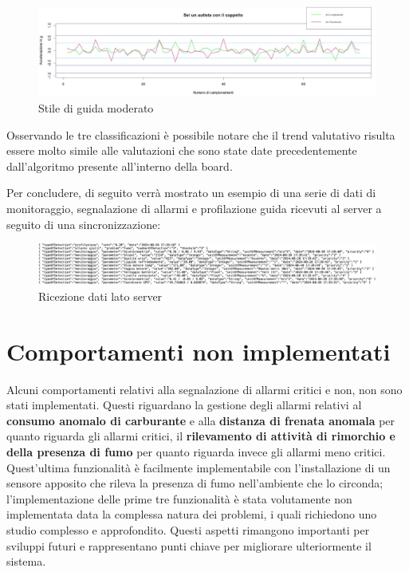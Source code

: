 \documentclass[12pt, a4paper, italian]{report}
\numberwithin{figure}{chapter}
\numberwithin{table}{chapter}
\begin{document}
\begin{figure}[h]
  \centering
  \includegraphics[width=14cm]{GuidaModerata.png}
  \caption{Stile di guida moderato}
  \label{Guida moderata}
\end{figure}

\newpage

Osservando le tre classificazioni è possibile notare che il trend valutativo risulta essere molto simile alle valutazioni che sono state date precedentemente dall'algoritmo presente all'interno della board. 

\vspace{1cm}

Per concludere, di seguito verrà mostrato un esempio di una serie di dati di monitoraggio, segnalazione di allarmi e profilazione guida ricevuti al server a seguito di una sincronizzazione:

\begin{figure}[h]
  \centering
  \includegraphics[width=16cm]{datiServer.png}
  \caption{Ricezione dati lato server}
  \label{fig:datiServer}
\end{figure}

\newpage

\section{Comportamenti non implementati}
Alcuni comportamenti relativi alla segnalazione di allarmi critici e non, non sono stati implementati. Questi riguardano la gestione degli allarmi relativi al \textbf{consumo anomalo di carburante} e alla \textbf{distanza di frenata anomala} per quanto riguarda gli allarmi critici, il \textbf{rilevamento di attività di rimorchio e della presenza di fumo} per quanto riguarda invece gli allarmi meno critici. Quest'ultima funzionalità è facilmente implementabile con l'installazione di un sensore apposito che rileva la presenza di fumo nell'ambiente che lo circonda; l'implementazione delle prime tre funzionalità è stata volutamente non implementata data la complessa natura dei problemi, i quali richiedono uno studio complesso e approfondito. Questi aspetti rimangono importanti per sviluppi futuri e rappresentano punti chiave per migliorare ulteriormente il sistema.
\end{document}

